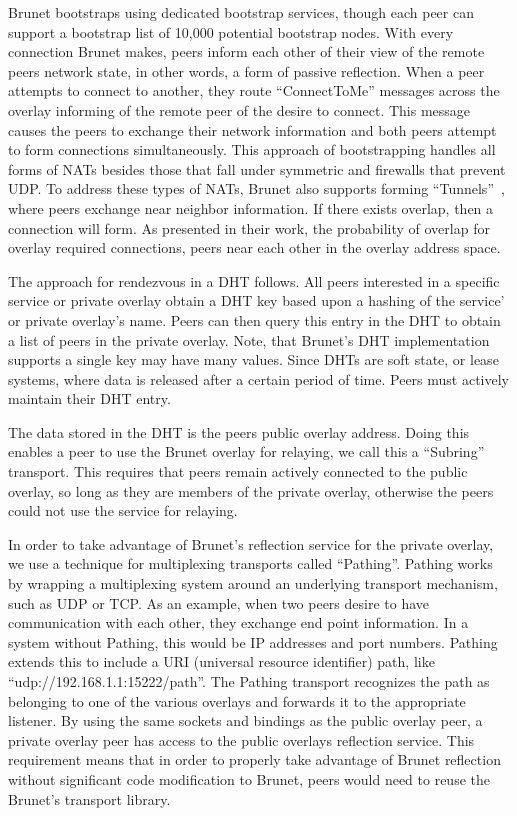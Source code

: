 \documentclass[conference]{IEEEtran}
\begin{document}
Brunet bootstraps using dedicated bootstrap services, though each peer can
support a bootstrap list of 10,000 potential bootstrap nodes.  With every
connection Brunet makes, peers inform each other of their view of the remote
peers network state, in other words, a form of passive reflection.  When a peer
attempts to connect to another, they route ``ConnectToMe'' messages across the
overlay informing of the remote peer of the desire to connect.  This message
causes the peers to exchange their network information and both peers attempt
to form connections simultaneously.  This approach of bootstrapping handles
all forms of NATs besides those that fall under symmetric and firewalls that
prevent UDP.  To address these types of NATs, Brunet also supports forming
``Tunnels''~\cite{hpdc08_0}, where peers exchange near neighbor information.
If there exists overlap, then a connection will form.  As presented in their
work, the probability of overlap for overlay required connections, peers near
each other in the overlay address space.

The approach for rendezvous in a DHT follows.  All peers interested in a
specific service or private overlay obtain a DHT key based upon a hashing of
the service' or private overlay's name.  Peers can then query this entry in the
DHT to obtain a list of peers in the private overlay.  Note, that Brunet's DHT
implementation supports a single key may have many values.  Since DHTs are
soft state, or lease systems, where data is released after a certain period of
time.  Peers must actively maintain their DHT entry.  

The data stored in the DHT is the peers public overlay address.  Doing this
enables a peer to use the Brunet overlay for relaying, we call this a
``Subring'' transport.  This requires that peers remain actively connected to
the public overlay, so long as they are members of the private overlay,
otherwise the peers could not use the service for relaying.

In order to take advantage of Brunet's reflection service for the private
overlay, we use a technique for multiplexing transports called ``Pathing''.
Pathing works by wrapping a multiplexing system around an underlying transport
mechanism, such as UDP or TCP.  As an example, when two peers desire to have
communication with each other, they exchange end point information.  In a
system without Pathing, this would be IP addresses and port numbers.  Pathing
extends this to include a URI (universal resource identifier) path, like
``udp://192.168.1.1:15222/path''.  The Pathing transport recognizes the path as
belonging to one of the various overlays and forwards it to the appropriate
listener.  By using the same sockets and bindings as the public overlay peer, a
private overlay peer has access to the public overlays reflection service.
This requirement means that in order to properly take advantage of Brunet
reflection without significant code modification to Brunet, peers would need to
reuse the Brunet's transport library.
\end{document}
